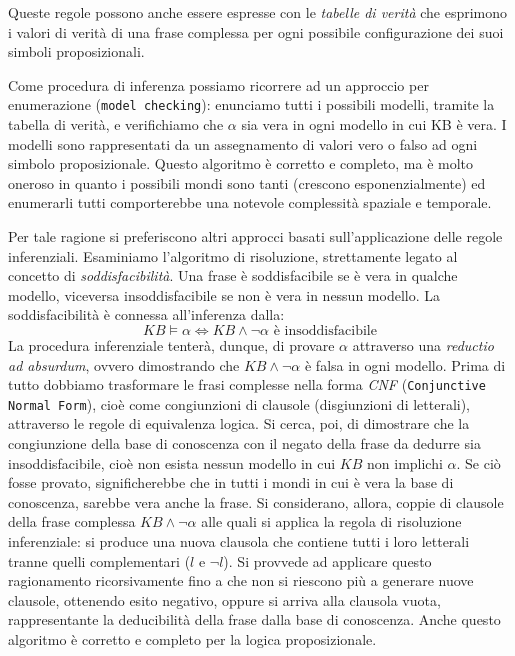 		Queste regole possono anche essere espresse con le \emph{tabelle di verità} che esprimono i valori di verità di una frase complessa per ogni possibile configurazione dei suoi simboli proposizionali.\par
		Come procedura di inferenza possiamo ricorrere ad un approccio per enumerazione (\texttt{model checking}): enunciamo tutti i possibili modelli, tramite la tabella di verità, e verifichiamo che $\alpha$ sia vera in ogni modello in cui KB è vera. I modelli sono rappresentati da un assegnamento di valori vero o falso ad ogni simbolo proposizionale. Questo algoritmo è corretto e completo, ma è molto oneroso in quanto i possibili mondi sono tanti (crescono esponenzialmente) ed enumerarli tutti comporterebbe una notevole complessità spaziale e temporale.
		\par
		Per tale ragione si preferiscono altri approcci basati sull'applicazione delle regole inferenziali. Esaminiamo l'algoritmo di risoluzione, strettamente legato al concetto di \emph{soddisfacibilità}. Una frase è soddisfacibile se è vera in qualche modello, viceversa insoddisfacibile se non è vera in nessun modello. La soddisfacibilità è connessa all'inferenza dalla:
		\begin{equation}
		KB\vDash\alpha \iff KB\wedge \neg \alpha \mbox{ è insoddisfacibile}
		\end{equation}
		La procedura inferenziale tenterà, dunque, di provare $\alpha$ attraverso una \emph{reductio ad absurdum}, ovvero dimostrando che $KB\wedge \neg \alpha$ è falsa in ogni modello. 
		Prima di tutto dobbiamo trasformare le frasi complesse nella forma \emph{CNF} (\texttt{Conjunctive Normal Form}), cioè come congiunzioni di clausole (disgiunzioni di letterali), attraverso le regole di equivalenza logica. %
		Si cerca, poi, di dimostrare che la congiunzione della base di conoscenza con il negato della frase da dedurre sia insoddisfacibile, cioè non esista nessun modello in cui $KB$ non implichi $\alpha$. Se ciò fosse provato, significherebbe che in tutti i mondi in cui è vera la base di conoscenza, sarebbe vera anche la frase. Si considerano, allora, coppie di clausole della frase complessa $KB\wedge \neg \alpha$ alle quali si applica la regola di risoluzione inferenziale: si produce una nuova clausola che contiene tutti i loro letterali tranne quelli complementari ($l$ e $\neg l$). Si provvede ad 
		applicare questo ragionamento ricorsivamente fino a che non si riescono più a generare nuove clausole, ottenendo esito negativo, oppure si arriva alla clausola vuota, rappresentante la deducibilità della frase dalla base di conoscenza. Anche questo algoritmo è corretto e completo per la logica proposizionale.\par
